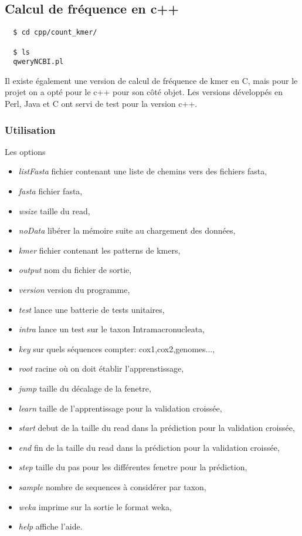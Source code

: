 \subsection{Calcul de fréquence en c++}
\label{cpp}

  \begin{verbatim}
  $ cd cpp/count_kmer/
  
  $ ls
  qweryNCBI.pl
\end{verbatim}
Il existe également une version de calcul de fréquence de kmer en C, mais pour
le projet on a opté pour le c++ pour son côté objet. Les versions développés en Perl, Java et C
ont servi de test pour la version c++.

\subsubsection{Utilisation}
Les options
\begin{itemize}
  \item \textit{listFasta}           fichier contenant une liste de chemins vers des fichiers fasta,
		\item \textit{fasta }              fichier fasta,
		\item\textit{wsize}               taille du read,
		\item \textit{noData}              libérer la mémoire suite au chargement des données,
		\item \textit{kmer}                fichier contenant les patterns de kmers,
		\item \textit{output}              nom du fichier de sortie,
		\item \textit{version}             version du programme,
		\item \textit{test}                lance une batterie de tests unitaires,
		\item \textit{intra}               lance un test sur le taxon Intramacronucleata,
		\item \textit{key}                 sur quels séquences compter: cox1,cox2,genomes...,
		\item \textit{root}                racine où on doit établir l'apprenstissage,
		\item \textit{jump}                taille du décalage de la fenetre,
		\item \textit{learn}               taille de l'apprentissage pour la validation croissée,
		\item \textit{start}               debut de la taille du read dans la prédiction pour la validation croissée,
		\item \textit{end}                 fin de la taille du read dans la prédiction pour la validation croissée,
		\item \textit{step}                taille du pas pour les différentes fenetre pour la prédiction,
		\item \textit{sample}              nombre de sequences à considérer par taxon,
		\item \textit{weka}                imprime sur la sortie le format weka,
		\item \textit{help}                affiche l'aide.
\end{itemize}

